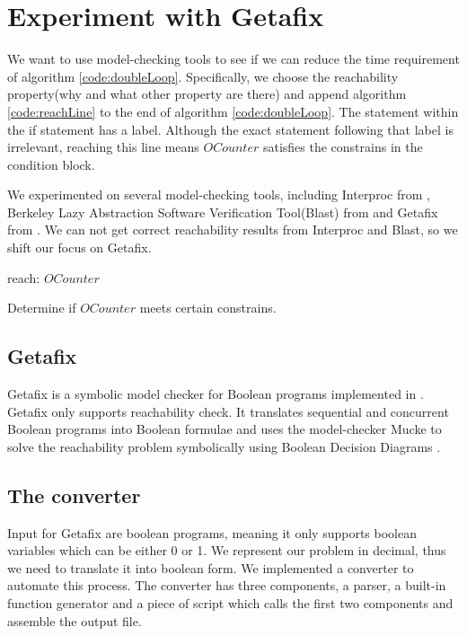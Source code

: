 \chapter{Experiment with Getafix}
	\label{CH_03}

We want to use model-checking tools to see if we can reduce the time requirement of algorithm \ref{code:doubleLoop}. Specifically, we choose the reachability property(why and what other property are there) and append algorithm \ref{code:reachLine} to the end of algorithm \ref{code:doubleLoop}. The statement within the if statement has a label. Although the exact statement following that label is irrelevant, reaching this line means $OCounter$ satisfies the constrains in the condition block.

We experimented on several model-checking tools, including Interproc from \cite{_interproc_2011}, Berkeley Lazy Abstraction Software Verification Tool(Blast) from \cite{_mtc_2008} and Getafix from \cite{la_torre_analyzing_2009}. We can not get correct reachability results from Interproc and Blast, so we shift our focus on Getafix.

\renewcommand{\algorithmiccomment}[1]{// #1}
\begin{algorithm}
\begin{algorithmic}

\STATE reach: $OCounter$
\ENDIF

\end{algorithmic}

\caption[Single loop]{Determine if $OCounter$ meets certain constrains.}
\label{code:reachLine}
\end{algorithm}

\section{Getafix}
Getafix is a symbolic model checker for Boolean programs implemented in \cite{la_torre_analyzing_2009}. Getafix only supports reachability check. It translates sequential and concurrent Boolean programs into Boolean formulae and uses the model-checker Mucke to solve the reachability problem symbolically using Boolean Decision Diagrams \cite{_getafix_2009}. 

\section{The converter}
Input for Getafix are boolean programs, meaning it only supports boolean variables which can be either 0 or 1. We represent our problem in decimal, thus we need to translate it into boolean form. We implemented a converter to automate this process. The converter has three components, a parser, a built-in function generator and a piece of script which calls the first two components and assemble the output file.

